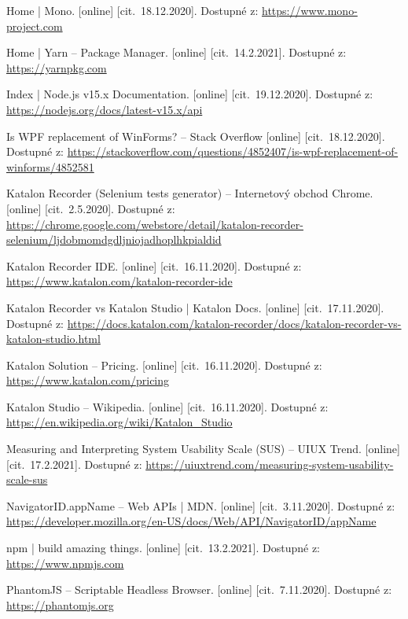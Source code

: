 \begin{flushleft}
\begin{thebibliography}{99}
 Home | Mono. [online] [cit.~18.12.2020]. Dostupné z: \url{https://www.mono-project.com}

 Home | Yarn -- Package Manager. [online] [cit.~14.2.2021]. Dostupné z: \url{https://yarnpkg.com}

 Index | Node.js v15.x Documentation. [online] [cit.~19.12.2020]. Dostupné z: \url{https://nodejs.org/docs/latest-v15.x/api}

 Is WPF replacement of WinForms? -- Stack Overflow [online] [cit.~18.12.2020]. Dostupné z: \url{https://stackoverflow.com/questions/4852407/is-wpf-replacement-of-winforms/4852581}

 Katalon Recorder (Selenium tests generator) -- Internetový obchod Chrome. [online] [cit.~2.5.2020]. Dostupné z: \url{https://chrome.google.com/webstore/detail/katalon-recorder-selenium/ljdobmomdgdljniojadhoplhkpialdid}

 Katalon Recorder IDE. [online] [cit.~16.11.2020]. Dostupné z: \url{https://www.katalon.com/katalon-recorder-ide}

 Katalon Recorder vs Katalon Studio | Katalon Docs. [online] [cit.~17.11.2020]. Dostupné z: \url{https://docs.katalon.com/katalon-recorder/docs/katalon-recorder-vs-katalon-studio.html}

 Katalon Solution -- Pricing. [online] [cit.~16.11.2020]. Dostupné z: \url{https://www.katalon.com/pricing}

 Katalon Studio -- Wikipedia. [online] [cit.~16.11.2020]. Dostupné z: \url{https://en.wikipedia.org/wiki/Katalon_Studio}

 Measuring and Interpreting System Usability Scale (SUS) -- UIUX Trend. [online] [cit.~17.2.2021]. Dostupné z: \url{https://uiuxtrend.com/measuring-system-usability-scale-sus}

 NavigatorID.appName -- Web APIs | MDN. [online] [cit.~3.11.2020]. Dostupné z: \url{https://developer.mozilla.org/en-US/docs/Web/API/NavigatorID/appName}

 npm | build amazing things. [online] [cit.~13.2.2021]. Dostupné z: \url{https://www.npmjs.com}

 PhantomJS -- Scriptable Headless Browser. [online] [cit.~7.11.2020]. Dostupné z: \url{https://phantomjs.org}


\end{thebibliography}
\end{flushleft}
